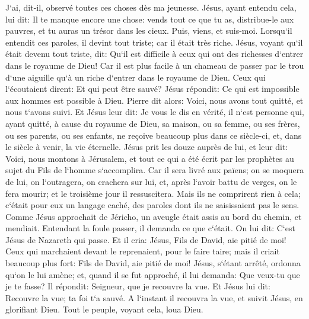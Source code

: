 \verse J`ai, dit-il, observé toutes ces choses dès ma jeunesse. 
\verse Jésus, ayant entendu cela, lui dit: Il te manque encore une chose: vends tout ce que tu as, distribue-le aux pauvres, et tu auras un trésor dans les cieux. Puis, viens, et suis-moi. 
\verse Lorsqu`il entendit ces paroles, il devint tout triste; car il était très riche. 
\verse Jésus, voyant qu`il était devenu tout triste, dit: Qu`il est difficile à ceux qui ont des richesses d`entrer dans le royaume de Dieu! 
\verse Car il est plus facile à un chameau de passer par le trou d`une aiguille qu`à un riche d`entrer dans le royaume de Dieu. 
\verse Ceux qui l`écoutaient dirent: Et qui peut être sauvé? 
\verse Jésus répondit: Ce qui est impossible aux hommes est possible à Dieu. 
\verse Pierre dit alors: Voici, nous avons tout quitté, et nous t`avons suivi. 
\verse Et Jésus leur dit: Je vous le dis en vérité, il n`est personne qui, ayant quitté, à cause du royaume de Dieu, sa maison, ou sa femme, ou ses frères, ou ses parents, ou ses enfants, 
\verse ne reçoive beaucoup plus dans ce siècle-ci, et, dans le siècle à venir, la vie éternelle. 
\verse Jésus prit les douze auprès de lui, et leur dit: Voici, nous montons à Jérusalem, et tout ce qui a été écrit par les prophètes au sujet du Fils de l`homme s`accomplira. 
\verse Car il sera livré aux païens; on se moquera de lui, on l`outragera, on crachera sur lui, 
\verse et, après l`avoir battu de verges, on le fera mourir; et le troisième jour il ressuscitera. 
\verse Mais ils ne comprirent rien à cela; c`était pour eux un langage caché, des paroles dont ils ne saisissaient pas le sens. 
\verse Comme Jésus approchait de Jéricho, un aveugle était assis au bord du chemin, et mendiait. 
\verse Entendant la foule passer, il demanda ce que c`était. 
\verse On lui dit: C`est Jésus de Nazareth qui passe. 
\verse Et il cria: Jésus, Fils de David, aie pitié de moi! 
\verse Ceux qui marchaient devant le reprenaient, pour le faire taire; mais il criait beaucoup plus fort: Fils de David, aie pitié de moi! 
\verse Jésus, s`étant arrêté, ordonna qu`on le lui amène; et, quand il se fut approché, 
\verse il lui demanda: Que veux-tu que je te fasse? Il répondit: Seigneur, que je recouvre la vue. 
\verse Et Jésus lui dit: Recouvre la vue; ta foi t`a sauvé. 
\verse A l`instant il recouvra la vue, et suivit Jésus, en glorifiant Dieu. Tout le peuple, voyant cela, loua Dieu. 

\chapter{}

